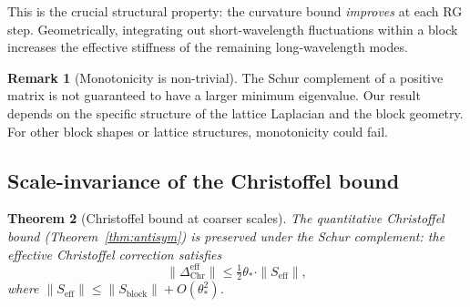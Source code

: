\documentclass[11pt]{article}
\newtheorem{theorem}{Theorem}[section]
\theoremstyle{definition}
\newtheorem{remark}[theorem]{Remark}
\begin{document}
This is the crucial structural property: the curvature bound
\emph{improves} at each RG step.  Geometrically, integrating out
short-wavelength fluctuations within a block increases the effective
stiffness of the remaining long-wavelength modes.

\begin{remark}[Monotonicity is non-trivial]
The Schur complement of a positive matrix is not guaranteed to have a
larger minimum eigenvalue.  Our result depends on the specific structure
of the lattice Laplacian and the block geometry.  For other block shapes
or lattice structures, monotonicity could fail.
\end{remark}

\subsection{Scale-invariance of the Christoffel bound}

\begin{theorem}[Christoffel bound at coarser scales]\label{thm:antisym-scale}
The quantitative Christoffel bound (Theorem~\ref{thm:antisym}) is
preserved under the Schur complement: the effective Christoffel
correction satisfies
\begin{equation}
\|\Delta_{\mathrm{Chr}}^{\mathrm{eff}}\|
\le\tfrac{1}{2}\theta_*\cdot\|S_{\mathrm{eff}}\|,
\end{equation}
where $\|S_{\mathrm{eff}}\|\le\|S_{\mathrm{block}}\|+O(\theta_*^2)$.
\end{theorem}
\end{document}
